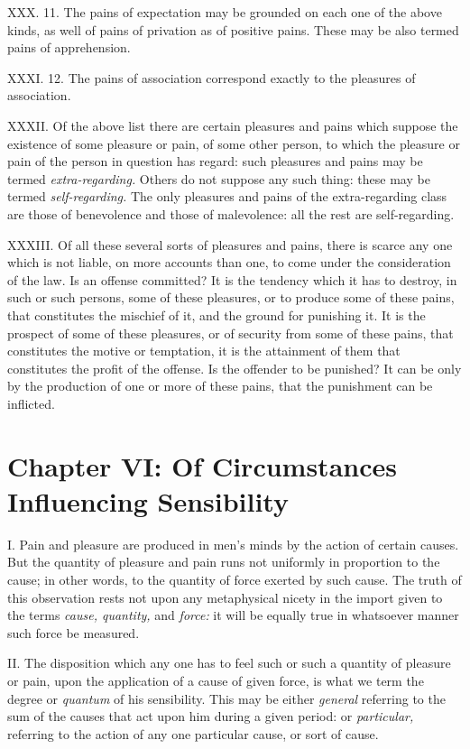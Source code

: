\documentclass[12pt]{report}
\begin{document}
XXX. 11. The pains of expectation may be grounded on each one of the
above kinds, as well of pains of privation as of positive pains. These
may be also termed pains of apprehension.

XXXI. 12. The pains of association correspond exactly to the pleasures
of association.

XXXII. Of the above list there are certain pleasures and pains which
suppose the existence of some pleasure or pain, of some other person, to
which the pleasure or pain of the person in question has regard: such
pleasures and pains may be termed \emph{extra-regarding.} Others do not
suppose any such thing: these may be termed \emph{self-regarding.} The
only pleasures and pains of the extra-regarding class are those of
benevolence and those of malevolence: all the rest are self-regarding.

XXXIII. Of all these several sorts of pleasures and pains, there is
scarce any one which is not liable, on more accounts than one, to come
under the consideration of the law. Is an offense committed? It is the
tendency which it has to destroy, in such or such persons, some of these
pleasures, or to produce some of these pains, that constitutes the
mischief of it, and the ground for punishing it. It is the prospect of
some of these pleasures, or of security from some of these pains, that
constitutes the motive or temptation, it is the attainment of them that
constitutes the profit of the offense. Is the offender to be punished?
It can be only by the production of one or more of these pains, that the
punishment can be inflicted.

\chapter{Chapter VI: Of Circumstances Influencing Sensibility}

I. Pain and pleasure are produced in men's minds by the action of
certain causes. But the quantity of pleasure and pain runs not uniformly
in proportion to the cause; in other words, to the quantity of force
exerted by such cause. The truth of this observation rests not upon any
metaphysical nicety in the import given to the terms \emph{cause,
quantity,} and \emph{force:} it will be equally true in whatsoever
manner such force be measured.

II. The disposition which any one has to feel such or such a quantity of
pleasure or pain, upon the application of a cause of given force, is
what we term the degree or \emph{quantum} of his sensibility. This may
be either \emph{general} referring to the sum of the causes that act
upon him during a given period: or \emph{particular,} referring to the
action of any one particular cause, or sort of cause.
\end{document}
